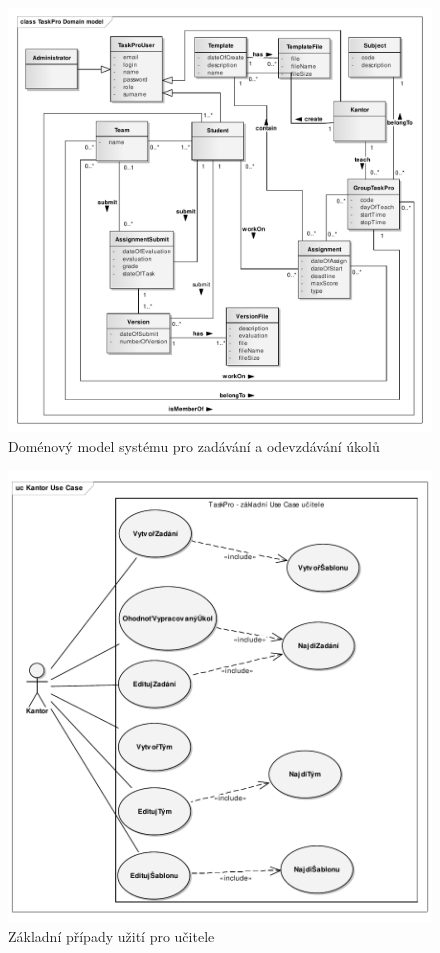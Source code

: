 \documentclass[11pt,twoside,a4paper]{book}
\begin{document}
\begin{figure}[h!]
\begin{center}
\includegraphics[width=\linewidth]{images/domainModel}
\caption{Doménový model systému pro zadávání a odevzdávání úkolů}
\label{img:domainModel}
\end{center}
\end{figure}

\begin{figure}
\begin{center}
\includegraphics{images/kantorUseCase}
\caption{Základní případy užití pro učitele}
\label{img:kantorUseCase}
\end{center}
\end{figure}
\end{document}
